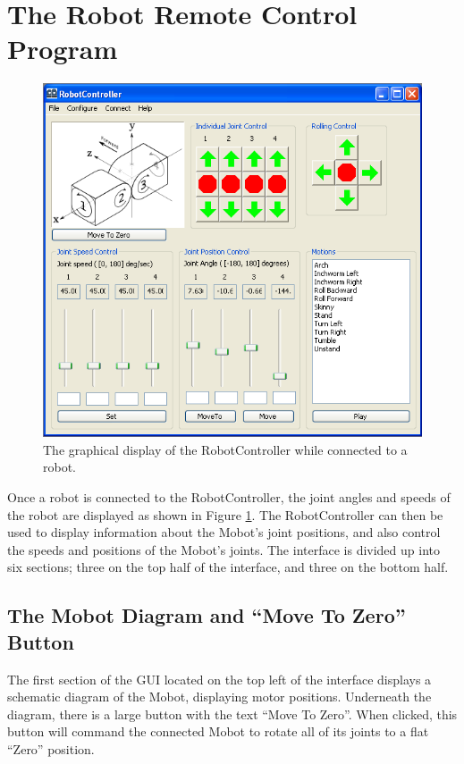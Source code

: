 \documentclass{article}
\begin{document}
\section{ The Robot Remote Control Program }
\begin{figure}[H]
\begin{center}
\includegraphics[width=4.5in]{images/shot1_populated.png}
\end{center}
\caption{\label{fig:shot1_populated.png} The graphical display of the RobotController
while connected to a robot.}
\end{figure}

Once a robot is connected to the RobotController, the joint angles and speeds
of the robot are displayed as shown in Figure \ref{fig:shot1_populated.png}.
The RobotController can then be
used to display
information about the Mobot's joint positions, and also control the
speeds and positions of the Mobot's joints. The interface is divided
up into six sections; three on the top half of the interface, and three on 
the bottom half. 

\subsection{The Mobot Diagram and ``Move To Zero'' Button}
The first section of the GUI located on the top left of the interface
displays a schematic diagram of the Mobot, displaying motor positions.
Underneath the diagram, there is a large button with the text 
``Move To Zero''. When clicked, this button will command the connected
Mobot to rotate all of its joints to a flat ``Zero'' position.
\end{document}
